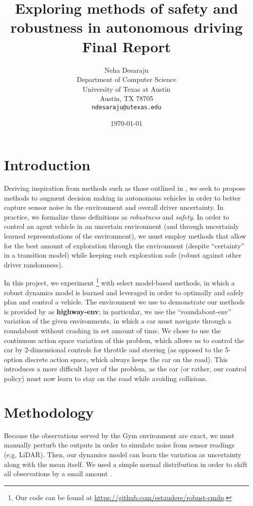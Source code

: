 \documentclass{article}
\title{Exploring methods of safety and robustness in autonomous driving \\ \small{Final Report}}
\author{Neha Desaraju \\ Department of Computer Science \\ University of Texas at Austin \\ Austin, TX 78705 \\ \texttt{ndesaraju@utexas.edu}}
\date{\today}
\begin{document}
\maketitle

\section*{Introduction}

Deriving inspiration from methods such as those outlined in \citep{leurent2019approximate}, we seek to propose methods to augment decision making in autonomous vehicles in order to better capture sensor noise in the environment and overall driver uncertainty. In practice, we formalize these definitions as \emph{robustness} and \emph{safety}. In order to control an agent vehicle in an uncertain environment (and through uncertainly learned representations of the environment), we must employ methods that allow for the best amount of exploration through the environment (despite ``certainty'' in a transition model) while keeping such exploration safe (robust against other driver randomness).

In this project, we experiment \footnote{Our code can be found at \url{https://github.com/estaudere/robust-cmdp}.} with select model-based methods, in which a robust dynamics model is learned and leveraged in order to optimally and safely plan and control a vehicle. The environment we use to demonstrate our methods is provided by \citep{highway-env} as \textbf{highway-env}; in particular, we use the ``roundabout-env'' variation of the given environments, in which a car must navigate through a roundabout without crashing in set amount of time. We chose to use the continuous action space variation of this problem, which allows us to control the car by 2-dimensional controls for throttle and steering (as opposed to the 5-option discrete action space, which always keeps the car on the road). This introduces a more difficult layer of the problem, as the car (or rather, our control policy) must now learn to stay on the road while avoiding collisions.

\section*{Methodology}

Because the observations served by the Gym environment are exact, we must manually perturb the outputs in order to simulate noise from sensor readings (e.g. LiDAR). Then, our dynamics model can learn the variation as uncertainty along with the mean itself. We used a simple normal distribution in order to shift all observations by a small amount \citep{khraishi2023simple}. 
\end{document}

